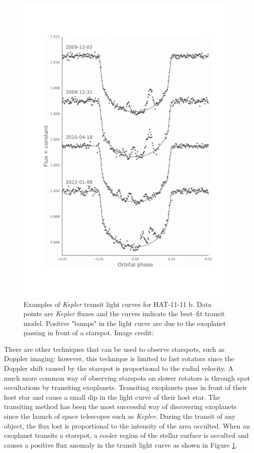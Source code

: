 \begin{figure}
    \centering
    \includegraphics[scale=0.3]{Figures/1-Introduction/hatp_11_spots.pdf}
    \caption[Light curves with examples of starspot "bumps" in exoplanet transits]{Examples of \textit{Kepler} transit light curves for HAT-11-11 b. Data points are \textit{Kepler} fluxes and the curves indicate the best--fit transit model. Positive "bumps" in the light curve are due to the exoplanet passing in front of a starspot. Image credit: \citet{Morris_etal_2017}}
    \label{fig:spot_occultation_example}
\end{figure}

There are other techniques that can be used to observe starspots, such as Doppler imaging: however, this technique is limited to fast rotators since the Doppler shift caused by the starspot is proportional to the radial velocity. A much more common way of observing starspots on slower rotators is through spot occultations by transiting exoplanets. Transiting exoplanets pass in front of their host star and cause a small dip in the light curve of their host star. The transiting method has been the most successful way of discovering exoplanets since the launch of space telescopes such as \textit{Kepler}. During the transit of any object, the flux lost is proportional to the intensity of the area occulted. When an exoplanet transits a starspot, a cooler region of the stellar surface is occulted and causes a positive flux anomaly in the transit light curve as shown in Figure \ref{fig:spot_occultation_example}.

